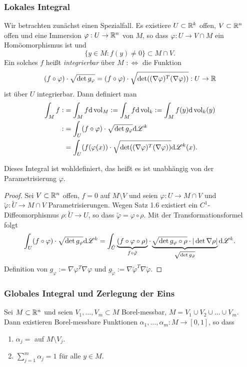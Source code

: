 \subsubsection{Lokales Integral}
Wir betrachten zunächst einen Spezialfall. Es existiere $U \subset \mathbb{R}^k$ offen, $V \subset \mathbb{R}^n$ offen und eine Immersion $\varphi : U \to \mathbb{R}^n$ von $M$, so dass $\varphi: U \to V \cap M$ ein Homöomorphismus ist und
\[ \{ y \in M : f(y) \ne 0 \} \subset M \cap V. \]
Ein solches $f$ heißt \emph{integrierbar} über $M$ $:\Leftrightarrow$ die Funktion
\[ (f \circ \varphi) \cdot \sqrt{\det g_\varphi} = (f \circ \varphi) \cdot \sqrt{ \det((\nabla \varphi)^T(\nabla \varphi))} : U \to \mathbb{R} \]
ist über $U$ integrierbar. Dann definiert man
\[ \begin{aligned}
    \int_M f :&= \int_M f \mathrm{d} \operatorname{vol}_M := \int_M f \mathrm{d} \operatorname{vol}_k := \int_M f(y) \mathrm{d} \operatorname{vol}_k(y) \\
    :&= \int_U (f \circ \varphi) \cdot \sqrt{\det g_\varphi} \mathrm{d} \mathscr{L}^k \\
     &= \int_U (f(\varphi(x)) \cdot \sqrt{\det ((\nabla \varphi)^T(\nabla \varphi))} \mathrm{d} \mathscr{L}^k(x).
   \end{aligned} \]

\begin{rmrk}
 Dieses Integral ist wohldefiniert, das heißt es ist unabhängig von der Parametrisierung $\varphi$.
\end{rmrk}

\begin{proof}
 Sei $V \subset \mathbb{R}^n$ offen, $f = 0$ auf $M \setminus V$ und seien $\varphi: U \to M \cap V$ und $\tilde{\varphi}: \tilde{U} \to M \cap V$ Parametrisierungen. Wegen Satz 1.6 existiert ein $C^1$-Diffeomorphismus $\rho: \tilde{U} \to U$, so dass $\tilde{\varphi} = \varphi \circ \rho$. Mit der Transformationsformel folgt
 \[
  \int_U (f \circ \varphi) \cdot \sqrt{\det g_\varphi} \mathrm{d} \mathscr{L}^k = \int_{\tilde{U}} \underbrace{(f \circ \varphi \circ \rho)}_{f \circ \tilde{\varphi}} \cdot \underbrace{\sqrt{ \det g_\varphi \circ \rho } \cdot | \det \nabla \rho |}_{\sqrt{\det g_{\tilde{\varphi}}}} \mathrm{d} \mathscr{L}^k. 
 \]
 Definition von $g_\varphi := \nabla \varphi^T \nabla \varphi$ und $g_{\tilde{\varphi}} := \nabla \tilde{\varphi}^T \nabla \tilde{\varphi}$.
\end{proof}

\subsubsection{Globales Integral und Zerlegung der Eins}
\begin{rmrk}
 Sei $M \subset \mathbb{R}^n$ und seien $V_1, \ldots, V_m \subset M$ Borel-messbar, $M = V_1 \cup V_2 \cup \ldots \cup V_m$. Dann existieren Borel-messbare Funktionen $\alpha_1, \ldots, \alpha_m : M \to [0,1]$, so dass
 \begin{enumerate}
  \item $\alpha_j = $ auf $M \setminus V_j$.
  \item $\sum_{j=1}^m \alpha_j = 1$ für alle $y \in M$.
 \end{enumerate}
\end{rmrk}

